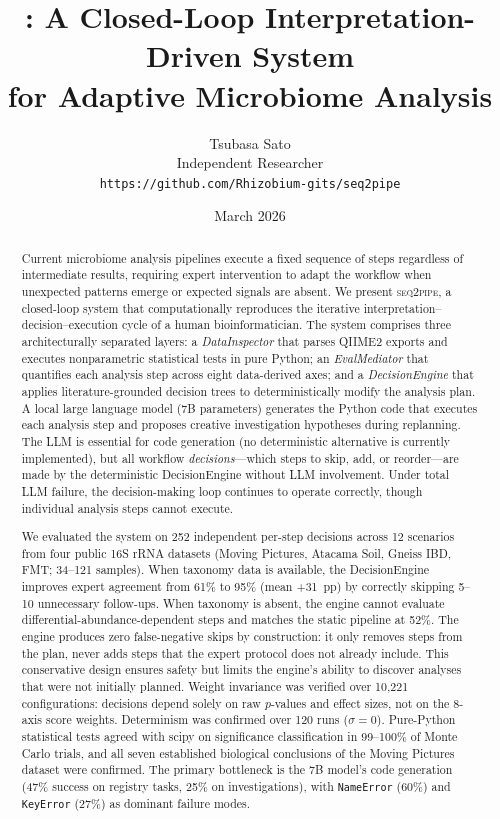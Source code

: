 \documentclass[11pt,a4paper]{article}
\title{
  \seqpipe: A Closed-Loop Interpretation-Driven System\\
  for Adaptive Microbiome Analysis
}
\author{
  Tsubasa Sato \\[4pt]
  Independent Researcher \\[4pt]
  \texttt{https://github.com/Rhizobium-gits/seq2pipe}
}
\date{March 2026}
\newcommand{\seqpipe}{\textsc{seq2pipe}}
\begin{document}
\maketitle

\begin{abstract}

Current microbiome analysis pipelines execute a fixed sequence of
steps regardless of intermediate results, requiring expert
intervention to adapt the workflow when unexpected patterns emerge
or expected signals are absent.
We present \seqpipe, a closed-loop system that computationally
reproduces the iterative interpretation--decision--execution cycle
of a human bioinformatician.
The system comprises three architecturally separated layers:
a \textit{DataInspector} that parses QIIME2 exports and executes
nonparametric statistical tests in pure Python;
an \textit{EvalMediator} that quantifies each analysis step across
eight data-derived axes;
and a \textit{DecisionEngine} that applies literature-grounded
decision trees to deterministically modify the analysis plan.
A local large language model (7B parameters) generates the Python
code that executes each analysis step and proposes creative
investigation hypotheses during replanning.
The LLM is essential for code generation (no deterministic
alternative is currently implemented), but all workflow
\textit{decisions}---which steps to skip, add, or reorder---are
made by the deterministic DecisionEngine without LLM involvement.
Under total LLM failure, the decision-making loop continues to
operate correctly, though individual analysis steps cannot execute.

We evaluated the system on 252 independent per-step decisions
across 12 scenarios from four public 16S rRNA datasets
(Moving Pictures, Atacama Soil, Gneiss IBD, FMT; 34--121 samples).
When taxonomy data is available, the DecisionEngine improves
expert agreement from 61\% to 95\% (mean +31~pp) by correctly
skipping 5--10 unnecessary follow-ups.
When taxonomy is absent, the engine cannot evaluate
differential-abundance-dependent steps and matches the static
pipeline at 52\%.
The engine produces zero false-negative skips by construction:
it only removes steps from the plan, never adds steps that the
expert protocol does not already include.
This conservative design ensures safety but limits the engine's
ability to discover analyses that were not initially planned.
Weight invariance was verified over 10,221 configurations:
decisions depend solely on raw $p$-values and effect sizes, not on
the 8-axis score weights.
Determinism was confirmed over 120 runs ($\sigma = 0$).
Pure-Python statistical tests agreed with scipy on significance
classification in 99--100\% of Monte Carlo trials, and all seven
established biological conclusions of the Moving Pictures dataset
were confirmed.
The primary bottleneck is the 7B model's code generation
(47\% success on registry tasks, 25\% on investigations),
with \texttt{NameError} (60\%) and \texttt{KeyError} (27\%) as
dominant failure modes.

\end{abstract}
\end{document}
